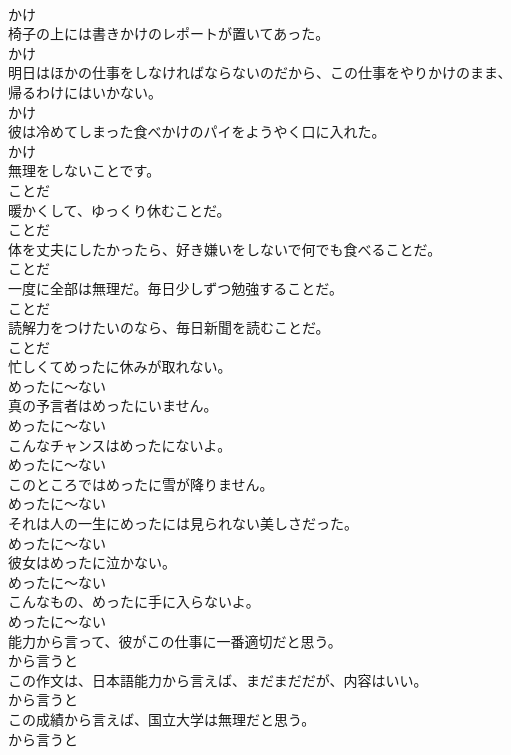 \documentclass[8pt]{extreport}
\begin{document}
\begin{CJK}{UTF8}{min}
\\	かけ
\\	椅子の上には書きかけのレポートが置いてあった。	
\\	かけ
\\	明日はほかの仕事をしなければならないのだから、この仕事をやりかけのまま、帰るわけにはいかない。	
\\	かけ
\\	彼は冷めてしまった食べかけのパイをようやく口に入れた。	
\\	かけ
\\	無理をしないことです。	
\\	ことだ
\\	暖かくして、ゆっくり休むことだ。	
\\	ことだ
\\	体を丈夫にしたかったら、好き嫌いをしないで何でも食べることだ。	
\\	ことだ
\\	一度に全部は無理だ。毎日少しずつ勉強することだ。	
\\	ことだ
\\	読解力をつけたいのなら、毎日新聞を読むことだ。	
\\	ことだ
\\	忙しくてめったに休みが取れない。	
\\	めったに～ない
\\	真の予言者はめったにいません。	
\\	めったに～ない
\\	こんなチャンスはめったにないよ。	
\\	めったに～ない
\\	このところではめったに雪が降りません。	
\\	めったに～ない
\\	それは人の一生にめったには見られない美しさだった。	
\\	めったに～ない
\\	彼女はめったに泣かない。	
\\	めったに～ない
\\	こんなもの、めったに手に入らないよ。	
\\	めったに～ない
\\	能力から言って、彼がこの仕事に一番適切だと思う。	
\\	から言うと
\\	この作文は、日本語能力から言えば、まだまだだが、内容はいい。	
\\	から言うと
\\	この成績から言えば、国立大学は無理だと思う。	
\\	から言うと

\end{CJK}
\end{document}
